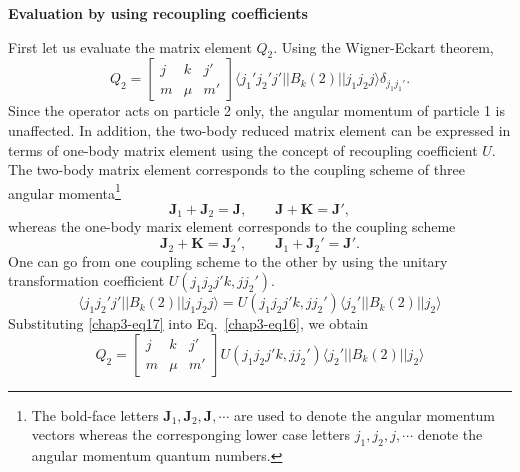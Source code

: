 \medskip
\noindent \textbf{\large Evaluation by using recoupling coefficients}
\medskip

\noindent First let us evaluate the matrix element $Q_2$. Using the Wigner-Eckart theorem,
\begin{equation}
Q_2 = \begin{bmatrix}j & k & j'\\m & \mu & m'\end{bmatrix}
\langle j_1' j_2' j' || B_k (2) || j_1 j_2 j \rangle \delta_{j_1 j_1'}. \label{chap3-eq16}
\end{equation}
Since the operator acts on particle 2 only, the angular momentum of particle 1 is unaffected. In addition, the two-body reduced matrix element can be expressed in terms of one-body matrix element using the concept of recoupling coefficient $U$. The two-body matrix element corresponds to the coupling scheme of three angular momenta\footnote{The bold-face letters ${\boldsymbol  J}_1, {\boldsymbol  J}_2, {\boldsymbol  J}, \cdots$ are used to denote the angular momentum vectors whereas the corresponging lower case letters $j_1, j_2, j, \cdots$ denote the angular momentum quantum numbers.}
$$
{\boldsymbol  J}_1 + {\boldsymbol  J}_2 = {\boldsymbol  J}, \qquad {\boldsymbol  J}+ {\boldsymbol  K}= {\boldsymbol  J}',
$$
whereas the one-body marix element corresponds to the coupling scheme
$$
{\boldsymbol  J}_2 + {\boldsymbol  K} = {\boldsymbol  J}_2', \qquad {\boldsymbol  J}_1+ {\boldsymbol  J}_2'= {\boldsymbol  J}'.
$$
One can go from one coupling scheme to the other by using the unitary transformation coefficient $U(j_1 j_2 j' k, j j_2')$.
\begin{equation}
\langle j_1 j_2' j' || B_k (2) || j_1 j_2 j \rangle = U (j_1 j_2 j' k, j j_2') \langle j_2' || B_k (2) || j_2\rangle \label{chap3-eq17}
\end{equation}
Substituting \eqref{chap3-eq17} into Eq.\ \eqref{chap3-eq16}, we obtain
\begin{equation}
Q_2 = \begin{bmatrix}j & k & j'\\m & \mu & m'\end{bmatrix}
U (j_1 j_2 j' k, j j_2') \langle j_2' || B_k (2) || j_2\rangle \label{chap3-eq18}
\end{equation}

